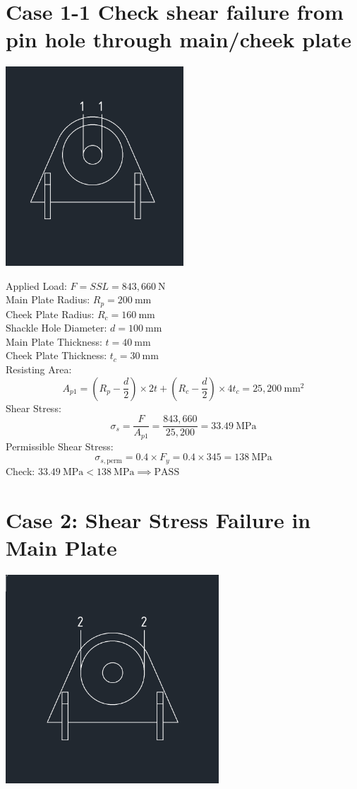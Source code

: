 \documentclass[12pt]{article}
\begin{document}
\section{Case 1-1 Check shear failure from pin hole through main/cheek plate}
\begin{center}
\includegraphics[width=0.5\textwidth]{image-2.png}
\end{center}
Applied Load: $F = SSL = 843,660\ \mathrm{N}$\\
Main Plate Radius: $R_p = 200\ \mathrm{mm}$\\
Cheek Plate Radius: $R_c = 160\ \mathrm{mm}$\\
Shackle Hole Diameter: $d = 100\ \mathrm{mm}$\\
Main Plate Thickness: $t = 40\ \mathrm{mm}$\\
Cheek Plate Thickness: $t_c = 30\ \mathrm{mm}$\\
Resisting Area:
\[
A_{p1} = (R_p - \frac{d}{2}) \times 2t + (R_c - \frac{d}{2}) \times 4t_c = 25,200\ \mathrm{mm}^2
\]
Shear Stress:
\[
\sigma_s = \frac{F}{A_{p1}} = \frac{843,660}{25,200} = 33.49\ \mathrm{MPa}
\]
Permissible Shear Stress:
\[
\sigma_{s,\text{perm}} = 0.4 \times F_y = 0.4 \times 345 = 138\ \mathrm{MPa}
\]
Check: $33.49\ \mathrm{MPa} < 138\ \mathrm{MPa} \implies \text{PASS}$

\section{Case 2: Shear Stress Failure in Main Plate}
\begin{center}
\includegraphics[width=0.6\textwidth]{Case2.png}
\end{center}
\end{document}
